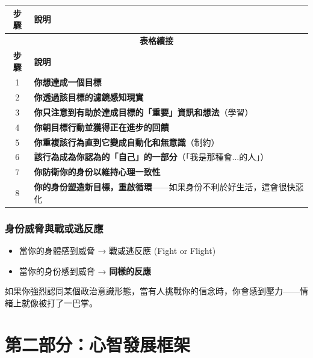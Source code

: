 \documentclass[12pt,a4paper]{article}
\begin{document}
\begin{longtable}{cp{12cm}}
\toprule
\textbf{步驟} & \textbf{說明} \\
\midrule
\endfirsthead

\multicolumn{2}{c}{\textbf{表格續接}} \\
\toprule
\textbf{步驟} & \textbf{說明} \\
\midrule
\endhead

\bottomrule
\endfoot

1 & \textbf{你想達成一個目標} \\
\midrule
2 & \textbf{你透過該目標的濾鏡感知現實} \\
\midrule
3 & \textbf{你只注意到有助於達成目標的「重要」資訊和想法}（學習） \\
\midrule
4 & \textbf{你朝目標行動並獲得正在進步的回饋} \\
\midrule
5 & \textbf{你重複該行為直到它變成自動化和無意識}（制約） \\
\midrule
6 & \textbf{該行為成為你認為的「自己」的一部分}（「我是那種會...的人」） \\
\midrule
7 & \textbf{你防衛你的身份以維持心理一致性} \\
\midrule
8 & \textbf{你的身份塑造新目標，重啟循環}——如果身份不利於好生活，這會很快惡化 \\
\bottomrule
\end{longtable}

\subsubsection{身份威脅與戰或逃反應}

\begin{itemize}
    \item 當你的身體感到威脅 → 戰或逃反應 (Fight or Flight)
    \item 當你的身份感到威脅 → \textbf{同樣的反應}
\end{itemize}

如果你強烈認同某個政治意識形態，當有人挑戰你的信念時，你會感到壓力——情緒上就像被打了一巴掌。


\section{第二部分：心智發展框架}
\end{document}
